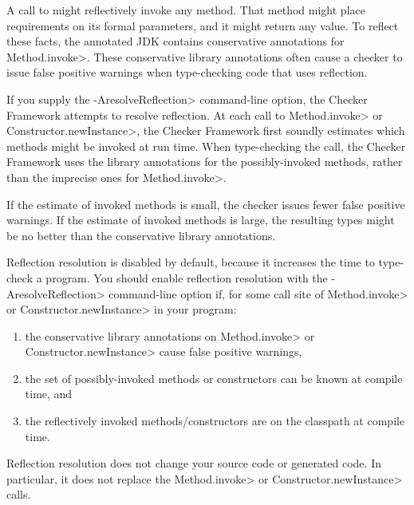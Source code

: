
\def\reflectionAnno#1#2{\refqualclass{common/reflection/qual}{#1}\code{#2}}



A call to
might reflectively invoke any method.  That method might place requirements
on its formal parameters, and it might return any value.  To reflect these
facts, the annotated JDK contains
conservative annotations for \<Method.invoke>.
These conservative library annotations often cause a checker to issue false
positive warnings when type-checking code that uses reflection.

If you supply the \<-AresolveReflection> command-line option, the Checker
Framework attempts to resolve reflection.  At each call to \<Method.invoke>
or \<Constructor.newInstance>, the Checker Framework first soundly estimates
which methods might be invoked at run time.  When type-checking the call, the
Checker Framework uses the library annotations for the possibly-invoked
methods, rather than the imprecise ones for \<Method.invoke>.

If the estimate of invoked methods is small,
the checker issues fewer false positive warnings.
If the estimate of invoked methods is large, the resulting types might be no better than the
conservative library annotations.

Reflection resolution is disabled by default, because it increases the time
to type-check a program.
You should enable reflection resolution with the \<-AresolveReflection>
command-line option if, for some call site of \<Method.invoke> or
\<Constructor.newInstance> in your program:
\begin{enumerate}
\item
  the conservative library annotations on \<Method.invoke> or
  \<Constructor.newInstance> cause false positive warnings,
\item
  the set of possibly-invoked methods or constructors can be known at
  compile time,
  and
\item
  the reflectively invoked methods/constructors are on the classpath at
  compile time.
\end{enumerate}

Reflection resolution does not change your source code or generated code.
In particular, it does not replace the \<Method.invoke> or
\<Constructor.newInstance> calls.

